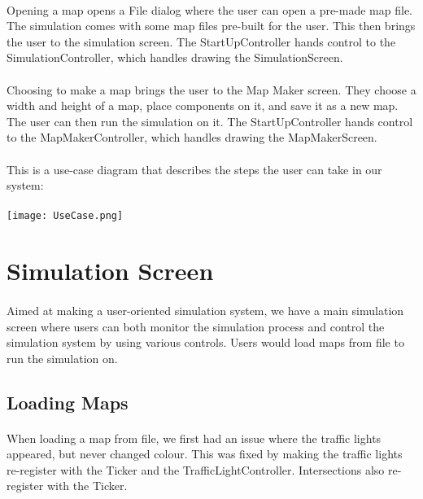 \documentclass[a4paper,11pt,titlepage]{article}
\begin{document}
\paragraph{}
Opening a map opens a File dialog where the user can open a pre-made map file. The simulation comes with some map files pre-built for the user. This then brings the user to the simulation screen. The StartUpController hands control to the SimulationController, which handles drawing the SimulationScreen. 
\paragraph{}
Choosing to make a map brings the user to the Map Maker screen. They choose a width and height of a map, place components on it, and save it as a new map. The user can then run the simulation on it. The StartUpController hands control to the MapMakerController, which handles drawing the MapMakerScreen.
\paragraph{}
This is a use-case diagram that describes the steps the user can take in our system:
\paragraph{}
\centerline{ \texttt{[image: UseCase.png]}}

\section{Simulation Screen}
\paragraph{}
Aimed at making a user-oriented simulation system, we have a main simulation screen where users can both monitor the simulation process and control the simulation system by using various controls. Users would load maps from file to run the simulation on.
\subsection{Loading Maps}
\paragraph{}
When loading a map from file, we first had an issue where the traffic lights appeared, but never changed colour. This was fixed by making the traffic lights re-register with the Ticker and the TrafficLightController. Intersections also re-register with the Ticker.
\end{document}
